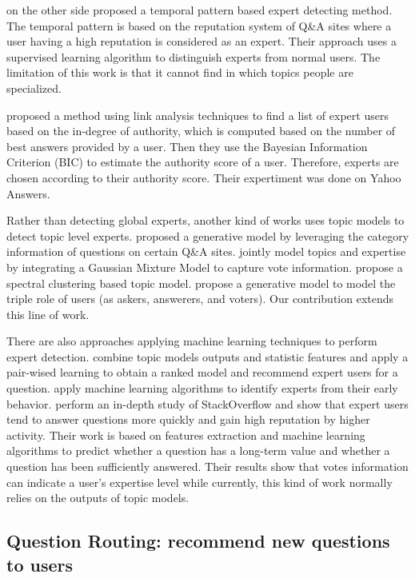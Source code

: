 \cite{chp2Pal:2010:Expert:evolution} on the other side proposed a temporal pattern based expert detecting method. The temporal pattern is based on the reputation system of Q\&A sites where a user having a high reputation is considered as an expert. Their approach uses a supervised learning algorithm to distinguish experts from normal users. The limitation of this work is that it cannot find in which topics people are specialized.

\cite{chp2Bouguessa:2008:Identify:authority:indegree} proposed a method using link analysis techniques to find a list of expert users based on the in-degree of authority, which is computed based on the number of best answers provided by a user. Then they use the Bayesian Information Criterion (BIC) to estimate the authority score of a user. Therefore, experts are chosen according to their authority score. Their expertiment was done on Yahoo Answers.


Rather than detecting global experts, another kind of works uses topic models to detect topic level experts. \cite{guo2008tapping} proposed a generative model by leveraging the category information of questions on certain Q\&A sites. \cite{yang2013cqarank} jointly model topics and expertise by  integrating a Gaussian Mixture Model to capture vote information. \cite{Chang:2013} propose a spectral clustering based topic model. 
\cite{ma2015tri} propose a generative model to model the triple role of users (as askers, answerers, and voters). Our contribution extends this line of work. 

There are also approaches applying machine learning techniques to perform expert detection. \cite{ji2013learning} combine topic models outputs and statistic features and apply a pair-wised learning to obtain a ranked model and recommend expert users for a question. \cite{pal2011early} apply machine learning algorithms to identify experts from their early behavior. \cite{anderson2012discovering} perform an in-depth study of StackOverflow and show that expert users tend to answer questions more quickly and gain high reputation by higher activity. Their work is based on features extraction and machine learning algorithms to predict whether a question has a long-term value and whether a question has been sufficiently answered. Their results show that votes information can indicate a user's expertise level while currently, this kind of work normally relies on the outputs of topic models.

\subsection{Question Routing: recommend new questions to users}

